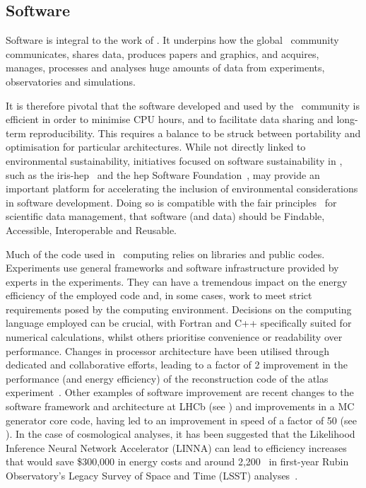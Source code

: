 \documentclass[../SustainableHEP.tex]{subfiles}
\begin{document}
\subsection{Software}\label{subsec:software}

Software is integral to the work of \ACR. It underpins how the global \ACR\ community communicates, shares data, produces papers and graphics, and acquires, manages, processes and analyses huge amounts of data from experiments, observatories and simulations.

It is therefore pivotal that the software developed and used by the \ACR\ community is efficient in order to minimise CPU hours, and to facilitate data sharing and long-term reproducibility. This requires a balance to be struck between portability and optimisation for particular architectures.  While not directly linked to environmental sustainability, initiatives focused on software sustainability in \ACR, such as the \acrshort{iris-hep}~\cite{IRISHEP} and the \acrshort{hep} Software Foundation~\cite{HSF}, may provide an important platform for accelerating the inclusion of  environmental considerations in software development. Doing so is compatible with the \acrshort{fair} principles~\cite{FAIR} for scientific data management, that software (and data) should be Findable, Accessible, Interoperable and Reusable.

Much of the code used in \ACR\ computing relies on libraries and public codes. Experiments use general frameworks and software infrastructure provided by experts in the experiments. They can have a tremendous impact on the energy efficiency of the employed code and, in some cases, work to meet strict requirements posed by the computing environment. Decisions on the computing language employed can be crucial, with Fortran and C++ specifically suited for numerical calculations, whilst others prioritise convenience or readability over performance.  Changes in processor architecture have been utilised through dedicated and collaborative  efforts, leading to a factor of 2 improvement in the performance (and energy efficiency) of the reconstruction code of the \acrshort{atlas} experiment~\cite{ATL-SOFT-PUB-2021-002}. Other examples of software improvement are recent changes to the software framework and architecture at LHCb (see ) and improvements in a MC generator core code, having led to an improvement in speed of a factor of 50 (see ).  In the case of cosmological analyses, it has been suggested that the Likelihood Inference Neural Network Accelerator (LINNA) can lead to efficiency increases that would save  \$300,000 in energy costs and around 2,200 \tCdO\ in first-year Rubin Observatory's Legacy Survey of Space and Time (LSST) analyses~\cite{To:2022ubu}.
\end{document}
